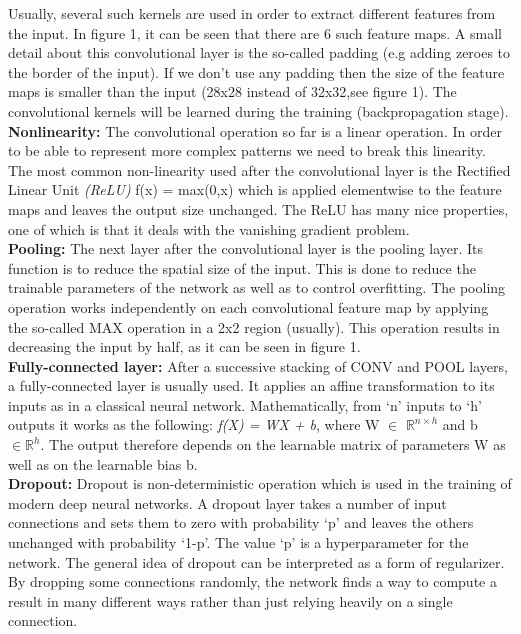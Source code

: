 \documentclass[a4paper]{article}
\begin{document}
\begin{justify}
Usually, several such kernels are used in order to extract different features from the input. In figure 1, it can be seen that there are 6 such feature maps. A small detail about this convolutional layer is the so-called padding (e.g adding zeroes to the border of the input). If we don't use any padding then the size of the feature maps is smaller than the input (28x28 instead of 32x32,see figure 1). The convolutional kernels will be learned during the training (backpropagation stage).
\newline
\\
\textbf{Nonlinearity:} The convolutional operation so far is a linear operation. In order to be able to represent more complex patterns we need to break this linearity. The most common non-linearity used after the convolutional layer is the Rectified Linear Unit \textit{(ReLU)} f(x) = max(0,x) which is applied elementwise to the feature maps and leaves the output size unchanged. The ReLU has many nice properties, one of which is that it deals with the vanishing gradient problem. 
\newline
\\
\textbf{Pooling:} The next layer after the convolutional layer is the pooling layer. Its function is to reduce the spatial size of the input. This is done to reduce the trainable parameters of the network as well as to control overfitting. The pooling operation works independently on each convolutional feature map by applying the so-called MAX operation in a 2x2 region (usually). This operation results in decreasing the input by half, as it can be seen in figure 1. 
\newline
\\
\textbf{Fully-connected layer:} After a successive stacking of CONV and POOL layers, a fully-connected layer is usually used. It applies an affine transformation to its inputs as in a classical neural network. Mathematically, from `n' inputs to `h' outputs it works as the following: \textit{f(X) = WX + b}, where W $\in$ $\mathbb{R}^{n \times h}$ and b $\in \mathbb{R}^{h}$. The output therefore depends on the learnable matrix of parameters W as well as on the learnable bias b.
\newline
\\
\textbf{Dropout:} Dropout is non-deterministic operation which is used in the training of modern deep neural networks. A dropout layer takes a number of input connections and sets them to zero with probability `p' and leaves the others unchanged with probability `1-p'. The value `p' is a hyperparameter for the network. The general idea of dropout can be interpreted as a form of regularizer. By dropping some connections randomly, the network finds a way to compute a result in many different ways rather than just relying heavily on a single connection. 

\end{justify}
\end{document}
